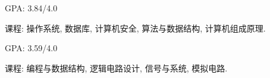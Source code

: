 \newcommand{\TUBentry}{
    \TUB
    \poswithprd{Introduction to 3D Scanning and Printing at TUB Winter University}{Jan 2018-Feb 2018}
    \begin{itemize}
        \item 
        Learned the basic of 3D scanning \& printing. Learned Blender for 3D modeling.
    \end{itemize}
}



\UM
{}
\begin{miniItemize}
    \item GPA: 3.84/4.0
    \item 课程:
        操作系统,
        数据库,
        计算机安全,
        算法与数据结构,
        计算机组成原理.
\end{miniItemize}

\SJTU
{}
\begin{miniItemize}
    \item GPA: 3.59/4.0
    \item 课程:
        编程与数据结构,
        逻辑电路设计,
        信号与系统,
        模拟电路.
\end{miniItemize}
